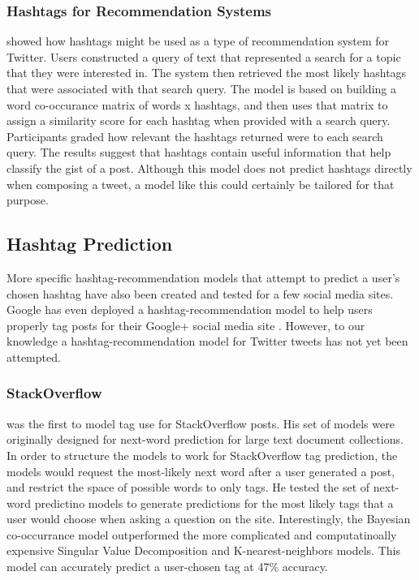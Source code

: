 \documentclass[man,floatsintext]{apa6}
\begin{document}
\subsubsection{Hashtags for Recommendation Systems}

\textcite{Efron2010} showed how hashtags might be used as a type of recommendation system for Twitter.
Users constructed a query of text that represented a search for a topic that they were interested in.
The system then retrieved the most likely hashtags that were associated with that search query.
The model is based on building a word co-occurance matrix of words x hashtags, and then uses that matrix to assign a similarity score for each hashtag when provided with a search query.
Participants graded how relevant the hashtags returned were to each search query.
The results suggest that hashtags contain useful information that help classify the gist of a post. 
Although this model does not predict hashtags directly when composing a tweet, a model like this could certainly be tailored for that purpose.

\subsection{Hashtag Prediction}

More specific hashtag-recommendation models that attempt to predict a user's chosen hashtag have also been created and tested for a few social media sites.
Google has even deployed a hashtag-recommendation model to help users properly tag posts for their Google+ social media site \parencite{GoogleKeynote2013}.
However, to our knowledge a hashtag-recommendation model for Twitter tweets has not yet been attempted.

\subsubsection{StackOverflow}

\textcite{Kuo2011} was the first to model tag use for StackOverflow posts.
His set of models were originally designed for next-word prediction for large text document collections.
In order to structure the models to work for StackOverflow tag prediction, the models would request the most-likely next word after a user generated a post, and restrict the space of possible words to only tags.
He tested the set of next-word predictino models to generate predictions for the most likely tags that a user would choose when asking a question on the site.
Interestingly, the Bayesian co-occurrance model outperformed the more complicated and computatinoally expensive Singular Value Decomposition and K-nearest-neighbors models.
This model can accurately predict a user-chosen tag at 47\% accuracy.
\end{document}
